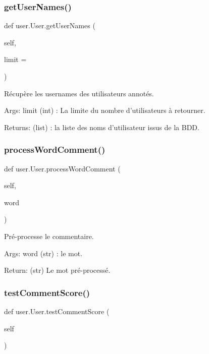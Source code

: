 \subsubsection{\texorpdfstring{get\+User\+Names()}{getUserNames()}}
{\footnotesize\ttfamily def user.\+User.\+get\+User\+Names (\begin{DoxyParamCaption}\item[{}]{self,  }\item[{}]{limit = {} }\end{DoxyParamCaption})}

\begin{DoxyVerb}Récupère les usernames des utilisateurs annotés.

Args:
limit (int) : La limite du nombre d'utilisateurs à retourner.

Returns:
(list) : la liste des noms d'utilisateur issus de la BDD.
\end{DoxyVerb}
 \mbox{\label{classuser_1_1_user_a91c0417fe409dae061a9acc84222e124}} 
\subsubsection{\texorpdfstring{process\+Word\+Comment()}{processWordComment()}}
{\footnotesize\ttfamily def user.\+User.\+process\+Word\+Comment (\begin{DoxyParamCaption}\item[{}]{self,  }\item[{}]{word }\end{DoxyParamCaption})}

\begin{DoxyVerb}Pré-processe le commentaire.

Args:
    word (str) : le mot.

Return:
    (str) Le mot pré-processé.
\end{DoxyVerb}
 \mbox{\label{classuser_1_1_user_a2bf236a7cfb42cb97298c49d29330e69}} 
\subsubsection{\texorpdfstring{test\+Comment\+Score()}{testCommentScore()}}
{\footnotesize\ttfamily def user.\+User.\+test\+Comment\+Score (\begin{DoxyParamCaption}\item[{}]{self }\end{DoxyParamCaption})}

